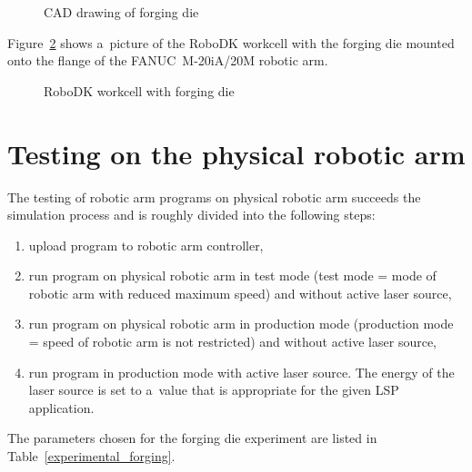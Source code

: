 \begin{figure}[h]
    \centering
    \noindent{}
    \caption{CAD drawing of forging die}
    \label{fig:cad}
\end{figure}
\noindent Figure~\ref{fig:robodk_die} shows a~picture of the RoboDK workcell with the forging die mounted onto the flange of the FANUC~M-20iA/20M robotic arm.

\begin{figure}[h!]
    \centering
    \noindent{}
    \caption{RoboDK workcell with forging die}
    \label{fig:robodk_die}
\end{figure}


\section{Testing on the physical robotic arm}

The testing of robotic arm programs on physical robotic arm succeeds the simulation process and is roughly divided into the following steps:

\begin{enumerate}
    
\item upload program to robotic arm controller,

\item run program on physical robotic arm in test mode (test mode = mode of robotic arm with reduced maximum speed) and without active laser source,

\item run program on physical robotic arm in production mode (production mode = speed of robotic arm is not restricted) and without active laser source,

\item run program in production mode with active laser source. The energy of the laser source is set to a~value that is appropriate for the given LSP application. 

\end{enumerate}
The parameters chosen for the forging die experiment are listed in Table~\ref{experimental_forging}. 

